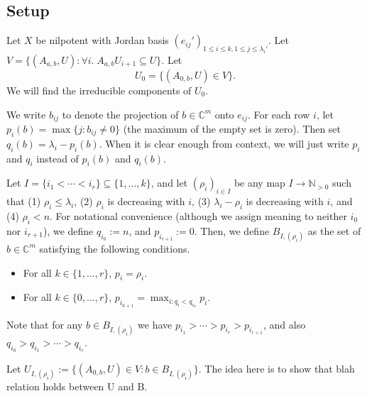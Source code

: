 \documentclass[12pt,psamsfonts]{article}
\begin{document}
\subsection{Setup}
Let \(X\) be nilpotent with Jordan basis \((e_{ij}')_{1 \leq i \leq k, 1 \leq j \leq \lambda_i'}\).
Let \(V = \{(A_{a,b}, U) : \forall i. \; A_{a,b} U_{i + 1} \subseteq U\}\).
Let
\[U_0 = \{(A_{0,b}, U) \in V\}.\]
We will find the irreducible components of \(U_0\).
\par We write \(b_{ij}\) to denote the projection of \(b \in \mathbb{C}^m\) onto \(e_{ij}\).
For each row \(i\), let \(p_i(b) = \max\{j : b_{ij} \neq 0\}\) (the maximum of the empty set is zero).
Then set \(q_i(b) = \lambda_i - p_i(b)\).
When it is clear enough from context, we will just write \(p_i\) and \(q_i\) instead of \(p_i(b)\) and \(q_i(b)\).
\par Let \(I = \{i_1 < \cdots < i_r\} \subseteq \{1, ..., k\}\), and let \((\rho_i)_{i \in I}\) be any map \(I \to \mathbb{N}_{> 0}\) such that (1) \(\rho_i \leq \lambda_i\), (2) \(\rho_i\) is decreasing with \(i\), (3) \(\lambda_i - \rho_i\) is decreasing with \(i\), and (4) \(\rho_i < n\).
For notational convenience (although we assign meaning to neither \(i_0\) nor \(i_{r + 1}\)), we define \(q_{i_0} := n\), and \(p_{i_{r + 1}} := 0\).
Then, we define \(B_{I, (\rho_i)}\) as the set of \(b \in \mathbb{C}^m\) satisfying the following conditions.
\begin{itemize}
    \item For all \(k \in \{1, ..., r\}\), \(p_i = \rho_i\).
    \item For all \(k \in \{0, ..., r\}\), \(p_{i_{k + 1}} = \max_{i : q_i < q_{i_k}} p_i\).
\end{itemize}
Note that for any \(b \in B_{I, (\rho_i)}\) we have \(p_{i_1} > \cdots > p_{i_r} > p_{i_{r + 1}}\), and also \(q_{i_0} > q_{i_1} > \cdots > q_{i_r}\).
\par Let \(U_{I, (\rho_i)} := \{(A_{0, b}, U) \in V : b \in B_{I, (\rho_i)}\}\).
The idea here is to show that blah relation holds between U and B.
\end{document}
